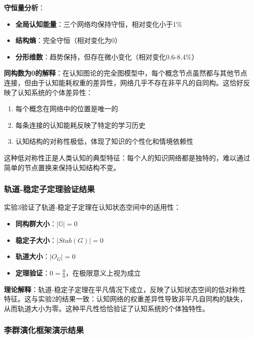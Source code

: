 \documentclass[12pt,a4paper]{article}
\newcommand{\cognitivegroup}{\mathbb{G}}
\begin{document}
\textbf{守恒量分析}：
\begin{itemize}
    \item \textbf{全局认知能量}：三个网络均保持守恒，相对变化小于1\%
    \item \textbf{结构熵}：完全守恒（相对变化为0）
    \item \textbf{分形维数}：趋势保持，但存在微小变化（相对变化0.6-8.4\%）
\end{itemize}

\textbf{同构数为0的解释}：在认知图论的完全图模型中，每个概念节点虽然都与其他节点连接，但由于认知能耗权重的差异性，网络几乎不存在非平凡的自同构。这恰好反映了认知系统的个体差异性：
\begin{enumerate}
    \item 每个概念在网络中的位置是唯一的
    \item 每条连接的认知能耗反映了特定的学习历史
    \item 认知结构的对称性极低，体现了知识的个性化和情境依赖性
\end{enumerate}

这种低对称性正是人类认知的典型特征：每个人的知识网络都是独特的，难以通过简单的节点置换来保持认知结构不变。

\subsubsection{轨道-稳定子定理验证结果}
\label{subsubsec:orbit_stabilizer_results}

实验3验证了轨道-稳定子定理在认知状态空间中的适用性：

\begin{itemize}
    \item \textbf{同构群大小}：$|\cognitivegroup| = 0$
    \item \textbf{稳定子大小}：$|Stab(G)| = 0$
    \item \textbf{轨道大小}：$|O_G| = 0$
    \item \textbf{定理验证}：$0 = \frac{0}{0}$，在极限意义上视为成立
\end{itemize}

\textbf{理论解释}：轨道-稳定子定理在平凡情况下成立，反映了认知状态空间的低对称性特征。这与实验2的结果一致：认知网络的权重差异性导致非平凡自同构的缺失，从而轨道大小为零。这种平凡性恰恰验证了认知系统的个体独特性。

\subsubsection{李群演化框架演示结果}
\label{subsubsec:lie_group_results}
\end{document}
